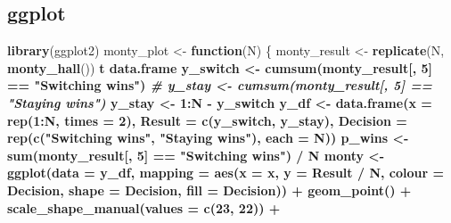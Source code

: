 \documentclass[
]{article}
\newenvironment{Shaded}{\begin{snugshade}}{\end{snugshade}}
\newcommand{\CommentTok}[1]{\textcolor[rgb]{0.56,0.35,0.01}{\textit{#1}}}
\newcommand{\ControlFlowTok}[1]{\textcolor[rgb]{0.13,0.29,0.53}{\textbf{#1}}}
\newcommand{\DataTypeTok}[1]{\textcolor[rgb]{0.13,0.29,0.53}{#1}}
\newcommand{\DecValTok}[1]{\textcolor[rgb]{0.00,0.00,0.81}{#1}}
\newcommand{\KeywordTok}[1]{\textcolor[rgb]{0.13,0.29,0.53}{\textbf{#1}}}
\newcommand{\NormalTok}[1]{#1}
\newcommand{\OperatorTok}[1]{\textcolor[rgb]{0.81,0.36,0.00}{\textbf{#1}}}
\newcommand{\StringTok}[1]{\textcolor[rgb]{0.31,0.60,0.02}{#1}}
\begin{document}
\hypertarget{ggplot}{%
\subsection{ggplot}\label{ggplot}}

\begin{Shaded}
\begin{Highlighting}[]
\KeywordTok{library}\NormalTok{(ggplot2)}
\NormalTok{monty_plot <-}\StringTok{ }\ControlFlowTok{function}\NormalTok{(N) \{}
\NormalTok{  monty_result <-}\StringTok{ }
\StringTok{    }\KeywordTok{replicate}\NormalTok{(N, }\KeywordTok{monty_hall}\NormalTok{()) }\OperatorTok{%
\StringTok{    }\NormalTok{t }\OperatorTok{%
\StringTok{    }\NormalTok{data.frame}
\NormalTok{  y_switch <-}\StringTok{ }\KeywordTok{cumsum}\NormalTok{(monty_result[, }\DecValTok{5}\NormalTok{] }\OperatorTok{==}\StringTok{ "Switching wins"}\NormalTok{)}
\CommentTok{#  y_stay <- cumsum(monty_result[, 5] == "Staying wins")}
\NormalTok{  y_stay <-}\StringTok{ }\DecValTok{1}\OperatorTok{:}\NormalTok{N }\OperatorTok{-}\StringTok{ }\NormalTok{y_switch}
\NormalTok{  y_df <-}\StringTok{ }\KeywordTok{data.frame}\NormalTok{(}\DataTypeTok{x =} \KeywordTok{rep}\NormalTok{(}\DecValTok{1}\OperatorTok{:}\NormalTok{N, }\DataTypeTok{times =} \DecValTok{2}\NormalTok{), }
                     \DataTypeTok{Result =} \KeywordTok{c}\NormalTok{(y_switch, y_stay), }
                     \DataTypeTok{Decision =} \KeywordTok{rep}\NormalTok{(}\KeywordTok{c}\NormalTok{(}\StringTok{"Switching wins"}\NormalTok{, }\StringTok{"Staying wins"}\NormalTok{), }\DataTypeTok{each =}\NormalTok{ N)) }
\NormalTok{  p_wins <-}\StringTok{ }\KeywordTok{sum}\NormalTok{(monty_result[, }\DecValTok{5}\NormalTok{] }\OperatorTok{==}\StringTok{ "Switching wins"}\NormalTok{) }\OperatorTok{/}\StringTok{ }\NormalTok{N}
\NormalTok{monty <-}\StringTok{  }
\StringTok{  }\KeywordTok{ggplot}\NormalTok{(}\DataTypeTok{data =}\NormalTok{ y_df, }
         \DataTypeTok{mapping =} \KeywordTok{aes}\NormalTok{(}\DataTypeTok{x =}\NormalTok{ x, }
                       \DataTypeTok{y =}\NormalTok{ Result }\OperatorTok{/}\StringTok{ }\NormalTok{N, }
                       \DataTypeTok{colour =}\NormalTok{ Decision,}
                       \DataTypeTok{shape =}\NormalTok{ Decision,}
                       \DataTypeTok{fill =}\NormalTok{ Decision)) }\OperatorTok{+}
\StringTok{    }\KeywordTok{geom_point}\NormalTok{() }\OperatorTok{+}
\StringTok{    }\KeywordTok{scale_shape_manual}\NormalTok{(}\DataTypeTok{values =} \KeywordTok{c}\NormalTok{(}\DecValTok{23}\NormalTok{, }\DecValTok{22}\NormalTok{)) }\OperatorTok{+}
}}
\end{Highlighting}
\end{Shaded}
\end{document}
